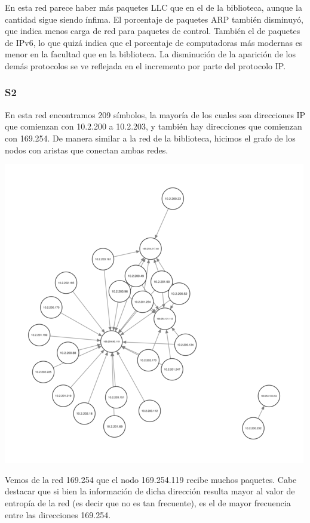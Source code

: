 En esta red parece haber más paquetes LLC que en el de la biblioteca, aunque la 
cantidad sigue siendo ínfima. El porcentaje de paquetes ARP también disminuyó,
que indica menos carga de red para paquetes de control. También el de paquetes
de IPv6, lo que quizá indica que el porcentaje de computadoras más modernas
es menor en la facultad que en la biblioteca. La disminución de la aparición
de los demás protocolos se ve reflejada en el incremento por parte del protocolo
IP.

\subsubsection{S2}
En esta red encontramos 209 símbolos, la mayoría de los cuales son 
direcciones IP
que comienzan con 10.2.200 a 10.2.203, y también hay direcciones
que comienzan con 169.254. De manera similar a la red de la biblioteca,
hicimos el grafo de los nodos con aristas que conectan ambas redes.

\begin{center}
\includegraphics[scale=0.6]{../img/exactas-redesAB.png} 
\end{center}

Vemos de la red 169.254 que el nodo 169.254.119 recibe muchos
paquetes. Cabe destacar que si bien la información de dicha dirección
resulta mayor al valor de entropía de la red (es decir que no es tan
frecuente), es el de mayor frecuencia entre las direcciones 169.254.

